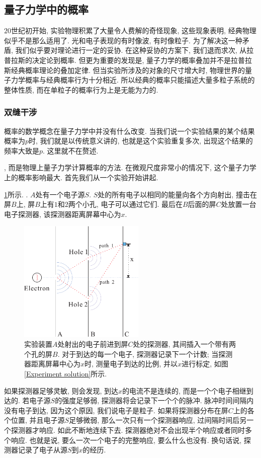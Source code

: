 \documentclass[a4paper,11pt]{article}
\begin{document}
\subsection{量子力学中的概率}
$20$世纪初开始, 实验物理积累了大量令人费解的奇怪现象, 这些现象表明, 经典物理似乎不是那么适用了. 光和电子表现的有时像波, 有时像粒子. 为了解决这一种矛盾, 我们似乎要对理论进行一定的妥协. 在这种妥协的方案下, 我们退而求次, 从拉普拉斯的决定论到概率. 但更为重要的发现是, 量子力学的概率叠加并不是拉普拉斯经典概率理论的叠加定律. 但当实验所涉及的对象的尺寸增大时, 物理世界的量子力学概率与经典概率行为十分相近. 所以经典的概率只能描述大量多粒子系统的整体性质, 而在单粒子的概率行为上是无能为力的.
\subsubsection{双缝干涉}
概率的数学概念在量子力学中并没有什么改变. 当我们说一个实验结果的某个结果概率为$p$时, 我们就是以传统意义讲的,  也就是这个实验重复多次, 出现这个结果的频率大致是$p$. 这里就不在赘述.

, 而是物理上量子力学计算概率的方法. 在微观尺度非常小的情况下, 这个量子力学上的概率影响最大. 首先我们从一个实验开始讲起.

\ref{pic-electron}所示. . $A$处有一个电子源$S$. $S$处的所有电子以相同的能量向各个方向射出,  撞击在屏$B$上, 屏$B$上有$1$和$2$两个小孔, 电子可以通过它们. 最后在$B$后面的屏$C$处放置一台电子探测器, 该探测器距离屏幕中心为$x$.
\begin{figure}[H]
  \centering
  \includegraphics[width=6cm]{fig4.pdf}
  \caption{实验装置$A$处射出的电子前进到屏$C$处的探测器, 其间插入一个带有两个孔的屏$B$. 对于到达的每一个电子, 探测器记录下一个计数; 当探测器距离屏幕中心为$x$时, 测量电子到达的比例, 并以$x$进行标定, 如图\ref{Experiment solution}所示.}\label{pic-electron}
\end{figure}
如果探测器足够灵敏, 则会发现, 到达$x$的电流不是连续的, 而是一个个电子相继到达的. 若电子源$S$的强度足够弱, 探测器将会记录下一个个的脉冲. 脉冲时间间隔内没有电子到达, 因为这个原因, 我们说电子是粒子. 如果将探测器分布在屏$C$上的各个位置, 并且电子源$S$足够微弱, 那么一次只有一个探测器响应, 过间隔时间后另一个探测器才响应. 如此不断地连续下去. 探测器绝对不会出现半个响应或者同时多个响应. 也就是说, 要么一次一个电子的完整响应, 要么什么也没有. 换句话说, 探测器记录了电子从源$S$到$x$的经历.
\end{document}
